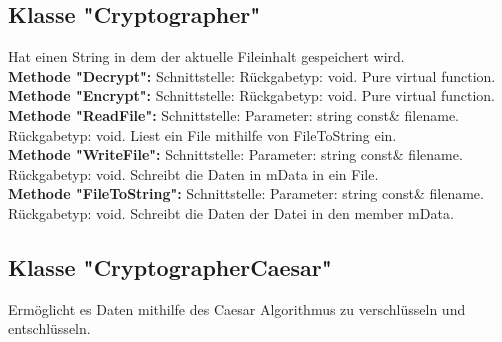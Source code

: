 \documentclass[12pt,a4paper]{article}
\begin{document}
\subsection {Klasse "Cryptographer"}
Hat einen String in dem der aktuelle Fileinhalt gespeichert wird.
\\

\textbf {Methode "Decrypt": } 
\newline
Schnittstelle: 
Rückgabetyp: void.
\newline
Pure virtual function.
\\

\textbf {Methode "Encrypt": } 
\newline
Schnittstelle:
\newline
Rückgabetyp: void.
\newline
Pure virtual function.
\\

\textbf {Methode "ReadFile": } 
\newline
Schnittstelle:
\newline
Parameter: string const\& filename.
\newline
Rückgabetyp: void.
\newline
Liest ein File mithilfe von FileToString ein.
\\

\textbf {Methode "WriteFile": } 
\newline
Schnittstelle: 
\newline
Parameter: string const\& filename.
\newline
Rückgabetyp: void.
\newline
Schreibt die Daten in mData in ein File.
\\

\textbf {Methode "FileToString": } 
\newline
Schnittstelle: 
\newline
Parameter: string const\& filename.
\newline
Rückgabetyp: void.
\newline
Schreibt die Daten der Datei in den member mData.
\\


\subsection {Klasse "CryptographerCaesar"}
Ermöglicht es Daten mithilfe des Caesar Algorithmus zu verschlüsseln und entschlüsseln.
\\
\end{document}
